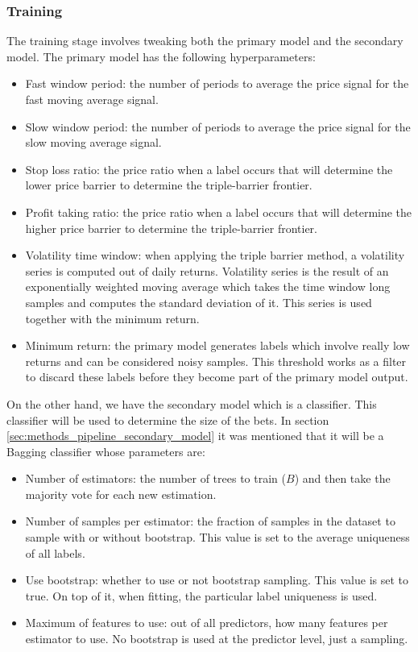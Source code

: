 \subsubsection{Training}
\label{sec:methods_pipeline_training}

The training stage involves tweaking both the primary model and the secondary
model. The primary model has the following hyperparameters:

\begin{itemize}
  \item Fast window period: the number of periods to average the price signal
        for the fast moving average signal.
  \item Slow window period: the number of periods to average the price signal
        for the slow moving average signal.
  \item Stop loss ratio: the price ratio when a label occurs that will determine
        the lower price barrier to determine the triple-barrier frontier.
  \item Profit taking ratio: the price ratio when a label occurs that will
        determine the higher price barrier to determine the triple-barrier
        frontier.
  \item Volatility time window: when applying the triple barrier method, a
        volatility series is computed out of daily returns. Volatility series is
        the result of an exponentially weighted moving average which takes the
        time window long samples and computes the standard deviation of it. This 
        series is used together with the minimum return.
  \item Minimum return: the primary model generates labels which involve really
        low returns and can be considered noisy samples. This threshold works 
        as a filter to discard these labels before they become part of the
        primary model output.
\end{itemize}

On the other hand, we have the secondary model which is a classifier. This
classifier will be used to determine the size of the bets. In section \ref{sec:methods_pipeline_secondary_model}
it was mentioned that it will be a Bagging classifier whose parameters are:

\begin{itemize}
  \item Number of estimators: the number of trees to train ($B$)
        and then take the majority vote for each new estimation.
  \item Number of samples per estimator: the fraction of samples in the dataset
        to sample with or without bootstrap. This value is set to the average
        uniqueness of all labels.
  \item Use bootstrap: whether to use or not bootstrap sampling. This value is
        set to true. On top of it, when fitting, the particular label uniqueness
        is used.
  \item Maximum of features to use: out of all predictors, how many features per
        estimator to use. No bootstrap is used at the predictor level, just a
        sampling. 
\end{itemize}

